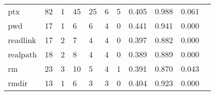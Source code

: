 \begin{longtable}{lp{1.2cm}p{1.2cm}p{1.2cm}p{1.2cm}p{1.2cm}p{1.2cm}p{1.2cm}p{1.2cm}p{1.2cm}p{1.2cm}}
ptx       &                                    82 &                                                  1 &                                                 45 &                                                 25 &                                                  6 &                                                  5 &                                         0.405 &                                              0.988 &                                              0.061 \\
pwd       &                                    17 &                                                  1 &                                                  6 &                                                  6 &                                                  4 &                                                  0 &                                         0.441 &                                              0.941 &                                              0.000 \\
readlink  &                                    17 &                                                  2 &                                                  7 &                                                  4 &                                                  4 &                                                  0 &                                         0.397 &                                              0.882 &                                              0.000 \\
realpath  &                                    18 &                                                  2 &                                                  8 &                                                  4 &                                                  4 &                                                  0 &                                         0.389 &                                              0.889 &                                              0.000 \\
rm        &                                    23 &                                                  3 &                                                 10 &                                                  5 &                                                  4 &                                                  1 &                                         0.391 &                                              0.870 &                                              0.043 \\
rmdir     &                                    13 &                                                  1 &                                                  6 &                                                  3 &                                                  3 &                                                  0 &                                         0.404 &                                              0.923 &                                              0.000 \\

\end{longtable}
